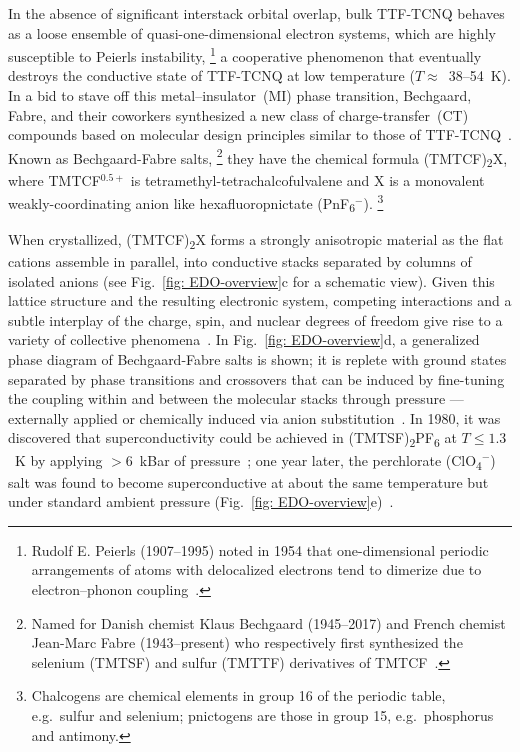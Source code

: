 In the absence of significant interstack orbital overlap,
bulk TTF-TCNQ behaves as a loose ensemble of
quasi-one-dimensional electron systems, which are highly susceptible to
Peierls instability,%
\footnote{Rudolf E. Peierls (1907--1995) noted in 1954 that
one-dimensional periodic arrangements of atoms with delocalized electrons
tend to dimerize due to electron--phonon coupling~\cite{PeierlsBook}.
}
%
a cooperative phenomenon that eventually destroys the conductive state of TTF-TCNQ
at low temperature ($T \approx $~38--54~K).
%
In a bid to stave off this metal--insulator~(MI) phase transition,
Bechgaard, Fabre, and their coworkers synthesized a new class of
charge-transfer~(CT) compounds based on molecular design principles
similar to those of TTF-TCNQ~\cite{Bechgaard1980}.
%
Known as Bechgaard-Fabre salts,%
\footnote{Named for Danish chemist Klaus Bechgaard (1945--2017) and
French chemist Jean-Marc Fabre (1943--present) who respectively
first synthesized the selenium (TMTSF) and sulfur (TMTTF) derivatives of TMTCF~\cite{Pouget2012}.}
%
they have the chemical formula (TMTCF)\textsubscript{2}X,
where TMTCF$^{0.5+}$ is tetramethyl-tetrachalcofulvalene
and X is a monovalent weakly-coordinating anion like
hexafluoropnictate (PnF\textsubscript{6}$^-$).%
\footnote{Chalcogens are chemical elements in group 16 of the periodic table, e.g.~sulfur and selenium;
pnictogens are those in group 15, e.g.~phosphorus and antimony.}

When crystallized, (TMTCF)\textsubscript{2}X forms a strongly anisotropic material
as the flat cations assemble in parallel, into conductive stacks separated by columns of isolated anions
(see Fig.~\ref{fig: EDO-overview}c for a schematic view).
%
Given this lattice structure and the resulting electronic system,
competing interactions and a subtle interplay
of the charge, spin, and nuclear degrees of freedom
give rise to a variety of collective phenomena~\cite{Kohler2011}.
%
In Fig.~\ref{fig: EDO-overview}d,
a generalized phase diagram of Bechgaard-Fabre salts is shown;
it is replete with ground states separated by phase transitions and crossovers
that can be induced by fine-tuning the coupling within and between the molecular stacks
through pressure --- externally applied
or chemically induced via anion substitution~\cite{Jerome1991}.
%
In 1980, it was discovered that superconductivity could be achieved in
(TMTSF)\textsubscript{2}PF\textsubscript{6} at $T \leq 1.3$~K
by applying $>6$~kBar of pressure~\cite{Bechgaard1980, Jerome1980};
one year later, the perchlorate (ClO\textsubscript{4}$^-$) salt was found
to become superconductive at about the same temperature but under standard ambient pressure
(Fig.~\ref{fig: EDO-overview}e)~\cite{Bechgaard1981, Jerome1982}.

